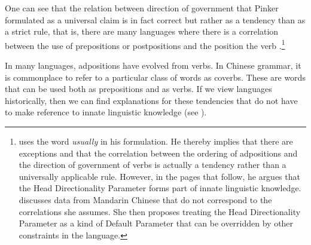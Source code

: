 One can see that the relation between direction of government that Pinker formulated as a universal
claim is in fact correct but rather as a tendency than as a strict rule, that is, there are many languages where
there is a correlation between the use of prepositions or postpositions and the position the verb
\citep[]{Dryer92a}.\footnote{%
\citet[]{Pinker94a} uses the word \emph{usually} in his formulation. He thereby implies
that there are exceptions and that the correlation between the ordering of adpositions and the
direction of government of verbs is actually a tendency rather than
a universally applicable rule. However, in the pages that follow, he argues that the Head Directionality Parameter forms part of innate linguistic knowledge.
\citet[]{Travis84a-u} discusses data from Mandarin Chinese that do not correspond to the correlations she assumes. She then proposes treating the Head Directionality Parameter
as a kind of Default Parameter that can be overridden by other constraints in the language.
} 

In many languages, adpositions have evolved from verbs. In Chinese grammar, it is commonplace to refer to a particular class of words as coverbs.
These are words that can be used both as prepositions and as verbs. If we view languages historically, then we can find explanations for these tendencies that do not have to make
reference to innate linguistic knowledge (see \citealp[]{EL2009a}). 

